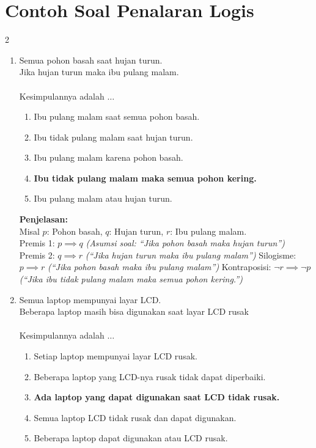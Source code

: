 \section{Contoh Soal Penalaran Logis}
\begin{multicols}{2}
  \begin{enumerate}
  \item Semua pohon basah saat hujan turun. \\
    Jika hujan turun maka ibu pulang malam. \\ \\
    Kesimpulannya adalah $\dots$
    \begin{enumerate}
    \item Ibu pulang malam saat semua pohon basah.
    \item Ibu tidak pulang malam saat hujan turun.
    \item Ibu pulang malam karena pohon basah.
    \item \textbf{Ibu tidak pulang malam maka semua pohon kering.}
    \item Ibu pulang malam atau hujan turun.
    \end{enumerate}
    \textbf{Penjelasan: } \\
    Misal $p$: Pohon basah, $q$: Hujan turun, $r$: Ibu pulang malam. \\
    Premis 1: $p \implies q$ \textit{(Asumsi soal: ``Jika pohon basah maka hujan turun'')} \\
    Premis 2: $q \implies r$ \textit{(``Jika hujan turun maka ibu pulang malam'')}
    Silogisme: $p \implies r$ \textit{(``Jika pohon basah maka ibu pulang malam'')}
    Kontraposisi: $\neg r \implies \neg p$ \textit{(``Jika ibu tidak pulang malam maka semua pohon kering.'')}
  \item Semua laptop mempunyai layar LCD. \\
    Beberapa laptop masih bisa digunakan saat layar LCD rusak \\ \\
    Kesimpulannya adalah $\dots$
    \begin{enumerate}
    \item Setiap laptop mempunyai layar LCD rusak.
    \item Beberapa laptop yang LCD-nya rusak tidak dapat diperbaiki.
    \item \textbf{Ada laptop yang dapat digunakan saat LCD tidak rusak.}
    \item Semua laptop LCD tidak rusak dan dapat digunakan.
    \item Beberapa laptop dapat digunakan atau LCD rusak.

\end{enumerate}
\end{enumerate}
\end{multicols}
